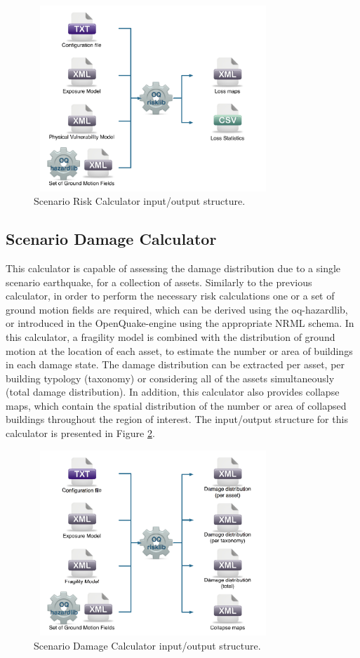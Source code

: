 \begin{figure}[ht]
\centering
\includegraphics[width=9cm,height=7cm]{./figures/risk/ScenarioRisk.pdf}
\caption{Scenario Risk Calculator input/output structure.}
\label{fig:ScnRisk}
\end{figure}

\subsection{Scenario Damage Calculator}
This calculator is capable of assessing the damage distribution due to a single scenario earthquake, for a collection of assets. Similarly to the previous calculator, in order to perform the necessary risk calculations one or a set of ground motion fields are required, which can be derived using the oq-hazardlib, or introduced in the OpenQuake-engine using the appropriate NRML schema.
In this calculator, a fragility model is combined with the distribution of ground motion at the location of each asset, to estimate the number or area of buildings in each damage state. The damage distribution can be extracted per asset, per building typology (taxonomy) or considering all of the assets simultaneously (total damage distribution). In addition, this calculator also provides collapse maps, which contain the spatial distribution of the number or area of collapsed buildings throughout the region of interest. The input/output structure for this calculator is presented in Figure \ref{fig:ScnDamage}.

\begin{figure}[ht]
\centering
\includegraphics[width=9cm,height=7cm]{./figures/risk/ScenarioDamage.pdf}
\caption{Scenario Damage Calculator input/output structure.}
\label{fig:ScnDamage}
\end{figure}

